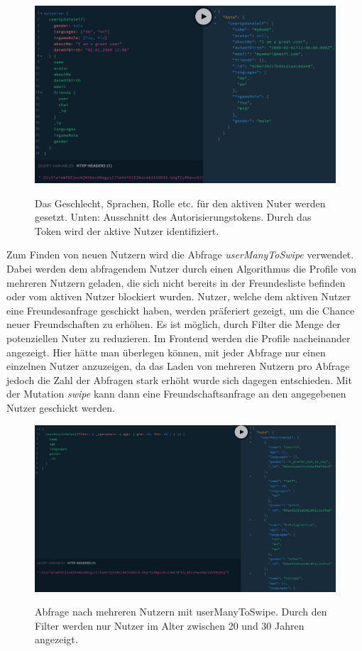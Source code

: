 \begin{figure}
	\centering
    \includegraphics[width=\textwidth]{sources/graphiql_userUpdateSelf.png}\cite{}
	\caption{Das Geschlecht, Sprachen, Rolle etc. für den aktiven Nuter werden gesetzt. Unten: Ausschnitt des Autorisierungstokens. Durch das Token wird der aktive Nutzer identifiziert.}
	\label{figGQL4}
\end{figure}

Zum Finden von neuen Nutzern wird die Abfrage \textit{userManyToSwipe} verwendet. Dabei werden dem abfragendem Nutzer durch einen Algorithmus die Profile von mehreren Nutzern geladen, die sich nicht bereits in der Freundesliste befinden oder vom aktiven Nutzer blockiert wurden. Nutzer, welche dem aktiven Nutzer eine Freundesanfrage geschickt haben, werden präferiert gezeigt, um die Chance neuer Freundschaften zu erhöhen. Es ist möglich, durch Filter die Menge der potenziellen Nuter zu reduzieren. Im Frontend werden die Profile nacheinander angezeigt. Hier hätte man überlegen können, mit jeder Abfrage nur einen einzelnen Nutzer anzuzeigen, da das Laden von mehreren Nutzern pro Abfrage jedoch die Zahl der Abfragen stark erhöht wurde sich dagegen entschieden.
Mit der Mutation \textit{swipe} kann dann eine Freundschaftsanfrage an den angegebenen Nutzer geschickt werden.

\begin{figure}
	\centering
    \includegraphics[width=\textwidth]{sources/graphiql_userManyToSwipe.png}\cite{}
	\caption{Abfrage nach mehreren Nutzern mit userManyToSwipe. Durch den Filter werden nur Nutzer im Alter zwischen 20 und 30 Jahren angezeigt.}
	\label{figGQL5}
\end{figure}

